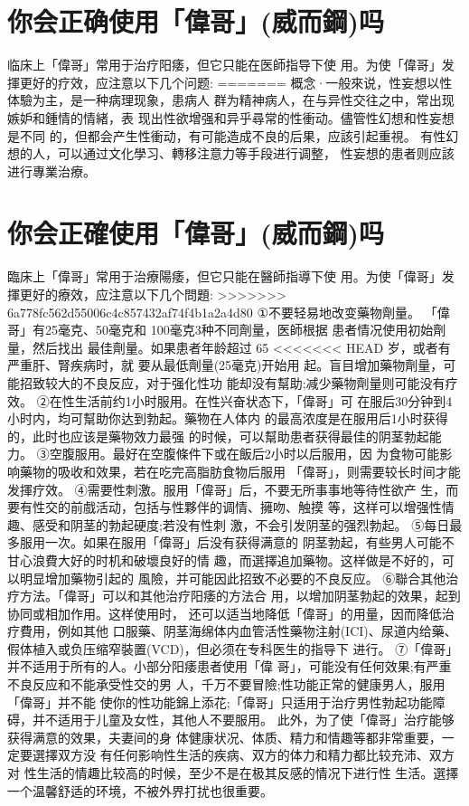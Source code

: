 \documentclass[12pt,UTF8]{ctexbook}
\begin{document}
\section{你会正确使用「偉哥」(威而鋼)吗}

临床上「偉哥」常用于治疗阳痿，但它只能在医師指导下使
用。为使「偉哥」发揮更好的疗效，应注意以下几个问题:
=======
概念·一般來说，性妄想以性体驗为主，是一种病理现象，患病人
群为精神病人，在与异性交往之中，常出现嫉妒和鍾情的情緒，表
现出性欲增强和异乎尋常的性衝动。儘管性幻想和性妄想是不同
的，但都会产生性衝动，有可能造成不良的后果，应該引起重視。
有性幻想的人，可以通过文化學习、轉移注意力等手段进行调整，
性妄想的患者则应該进行專業治療。

\section{你会正確使用「偉哥」(威而鋼)吗}

臨床上「偉哥」常用于治療陽痿，但它只能在醫師指導下使
用。为使「偉哥」发揮更好的療效，应注意以下几个問題:
>>>>>>> 6a778fc562d55006c4c857432af74f4b1a2a4d80
①不要轻易地改变藥物劑量。
「偉哥」有25毫克、50毫克和
100毫克3种不同劑量，医師根据
患者情况使用初始劑量，然后找出
最佳劑量。如果患者年龄超过 65
<<<<<<< HEAD
岁，或者有严重肝、腎疾病时，就
要从最低劑量(25毫克)开始用
起。盲目增加藥物劑量，可能招致较大的不良反应，对于强化性功
能却没有幫助;减少藥物劑量则可能没有疗效。
②在性生活前约1小时服用。在性兴奋状态下，「偉哥」可
在服后30分钟到4小时内，均可幫助你达到勃起。藥物在人体内
的最高浓度是在服用后1小时获得的，此时也应该是藥物效力最强
的时候，可以幫助患者获得最佳的阴茎勃起能力。
③空腹服用。最好在空腹條件下或在飯后2小时以后服用，因
为食物可能影响藥物的吸收和效果，若在吃完高脂肪食物后服用
「偉哥」，则需要较长时间才能发揮疗效。
④需要性刺激。服用「偉哥」后，不要无所事事地等待性欲产
生，而要有性交的前戲活动，包括与性夥伴的调情、擁吻、触摸
等，这样可以增强性情趣、感受和阴茎的勃起硬度;若没有性刺
激，不会引发阴茎的强烈勃起。
⑤每日最多服用一次。如果在服用「偉哥」后没有获得满意的
阴茎勃起，有些男人可能不甘心浪費大好的时机和破壞良好的情
趣，而選擇追加藥物。这样做是不好的，可以明显增加藥物引起的
風險，并可能因此招致不必要的不良反应。
⑥聯合其他治疗方法。「偉哥」可以和其他治疗阳痿的方法合
用，以增加阴茎勃起的效果，起到协同或相加作用。这样使用时，
还可以适当地降低「偉哥」的用量，因而降低治疗費用，例如其他
口服藥、阴茎海绵体内血管活性藥物注射(ICI)、尿道内给藥、
假体植入或负压缩窄裝置(VCD)，但必须在专科医生的指导下
进行。
⑦「偉哥」并不适用于所有的人。小部分阳痿患者使用「偉
哥」，可能没有任何效果;有严重不良反应和不能承受性交的男
人，千万不要冒險;性功能正常的健康男人，服用「偉哥」并不能
使你的性功能錦上添花;「偉哥」只适用于治疗男性勃起功能障
碍，并不适用于儿童及女性，其他人不要服用。
此外，为了使「偉哥」治疗能够获得满意的效果，夫妻间的身
体健康状况、体质、精力和情趣等都非常重要，一定要選擇双方没
有任何影响性生活的疾病、双方的体力和精力都比较充沛、双方对
性生活的情趣比较高的时候，至少不是在极其反感的情况下进行性
生活。選擇一个温馨舒适的环境，不被外界打扰也很重要。
\end{document}
